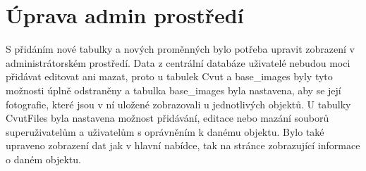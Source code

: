 \section{Úprava admin prostředí}

S přidáním nové tabulky a nových proměnných bylo potřeba upravit zobrazení v administrátorském prostředí. Data z centrální databáze uživatelé nebudou moci přidávat editovat ani mazat, proto u tabulek Cvut a base\_images byly tyto možnosti úplně odstraněny a tabulka base\_images byla nastavena, aby se její fotografie, které jsou v ní uložené zobrazovali u jednotlivých objektů. U tabulky CvutFiles byla nastavena možnost přidávání, editace nebo mazání souborů superuživatelům a uživatelům s oprávněním k danému objektu. Bylo také upraveno zobrazení dat jak v hlavní nabídce, tak na stránce zobrazující informace o daném objektu.








































